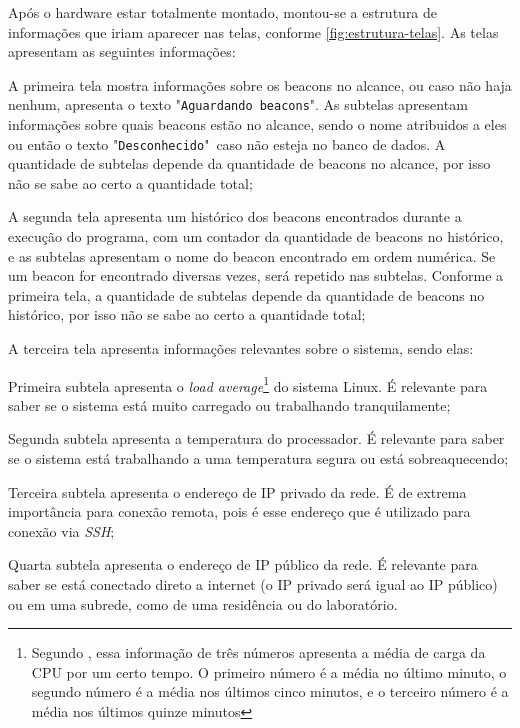 \documentclass[
		12pt,				%
		openright,			%
		oneside,			%
		a4paper,			%
		chapter=TITLE,		%
		english,			%
		brazil				%
	]{abntex2}
\begin{document}
Após o hardware estar totalmente montado, montou-se a estrutura de informações que iriam aparecer nas telas, conforme \autoref{fig:estrutura-telas}. As telas apresentam as seguintes informações:

\begin{alineas}
	\item A primeira tela mostra informações sobre os beacons no alcance, ou caso não haja nenhum, apresenta o texto "\texttt{Aguardando beacons}". As subtelas apresentam informações sobre quais beacons estão no alcance, sendo o nome atribuidos a eles ou então o texto "\texttt{Desconhecido}"\ caso não esteja no banco de dados. A quantidade de subtelas depende da quantidade de beacons no alcance, por isso não se sabe ao certo a quantidade total;
	\item A segunda tela apresenta um histórico dos beacons encontrados durante a execução do programa, com um contador da quantidade de beacons no histórico, e as subtelas apresentam o nome do beacon encontrado em ordem numérica. Se um beacon for encontrado diversas vezes, será repetido nas subtelas. Conforme a primeira tela, a quantidade de subtelas depende da quantidade de beacons no histórico, por isso não se sabe ao certo a quantidade total;
	\item A terceira tela apresenta informações relevantes sobre o sistema, sendo elas:
	\begin{subalineas}
		\item Primeira subtela apresenta o \textit{load average}\footnote{Segundo , essa informação de três números apresenta a média de carga da CPU por um certo tempo. O primeiro número é a média no último minuto, o segundo número é a média nos últimos cinco minutos, e o terceiro número é a média nos últimos quinze minutos} do sistema Linux. É relevante para saber se o sistema está muito carregado ou trabalhando tranquilamente;
		\item Segunda subtela apresenta a temperatura do processador. É relevante para saber se o sistema está trabalhando a uma temperatura segura ou está sobreaquecendo;
		\item Terceira subtela apresenta o endereço de IP privado da rede. É de extrema importância para conexão remota, pois é esse endereço que é utilizado para conexão via \textit{SSH};
		\item Quarta subtela apresenta o endereço de IP público da rede. É relevante para saber se está conectado direto a internet (o IP privado será igual ao IP público) ou em uma subrede, como de uma residência ou do laboratório.
	\end{subalineas}
\end{alineas}
\end{document}
